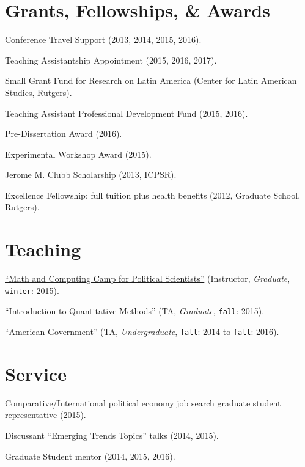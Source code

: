 \documentclass[letterpaper]{article}
\renewenvironment{itemize}{
  \begin{list}{}{
    \setlength{\leftmargin}{1.5em}
  }
}{
  \end{list}
}
\begin{document}
\section*{Grants, Fellowships, \& Awards}

\begin{itemize}
\item Conference Travel Support (2013, 2014, 2015, 2016).
\item Teaching Assistantship Appointment (2015, 2016, 2017).
\item Small Grant Fund for Research on Latin America (Center for Latin American Studies, Rutgers).
\item Teaching Assistant Professional Development Fund (2015, 2016).
\item Pre-Dissertation Award (2016).
\item Experimental Workshop Award (2015).
\item Jerome M. Clubb Scholarship (2013, ICPSR).
\item Excellence Fellowship: full tuition plus health benefits (2012, Graduate School, Rutgers).
\end{itemize}


\section*{Teaching}

\begin{itemize}
\item \href{http://github.com/hbahamonde/Math-Camp/raw/master/Syllabus/Math_Camp_Syllabus.pdf/}{``Math and Computing Camp for Political Scientists''} (Instructor, \emph{Graduate}, \texttt{winter}: 2015).
\item ``Introduction to Quantitative Methods'' (TA, \emph{Graduate}, \texttt{fall}: 2015).
\item ``American Government'' (TA, \emph{Undergraduate}, \texttt{fall}: 2014 to \texttt{fall}: 2016).
\end{itemize}


\section*{Service}

\begin{itemize}
\item Comparative/International political economy job search graduate student representative (2015).
\item Discussant ``Emerging Trends Topics'' talks (2014, 2015).
\item Graduate Student mentor (2014, 2015, 2016).
\end{itemize}
\end{document}
